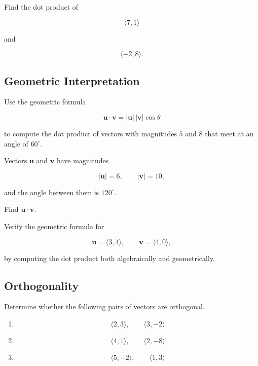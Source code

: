 \begin{exercise}
Find the dot product of

\[
\langle 7,1\rangle
\]

and

\[
\langle -2,8\rangle.
\]
\end{exercise}

\subsection*{Geometric Interpretation}

\begin{exercise}
Use the geometric formula

\[
\mathbf{u}\cdot\mathbf{v}
=
|\mathbf{u}|\,|\mathbf{v}|\cos\theta
\]

to compute the dot product of vectors with magnitudes $5$ and $8$ that
meet at an angle of $60^\circ$.
\end{exercise}

\begin{exercise}
Vectors $\mathbf{u}$ and $\mathbf{v}$ have magnitudes

\[
|\mathbf{u}|=6,
\qquad
|\mathbf{v}|=10,
\]

and the angle between them is $120^\circ$.

Find $\mathbf{u}\cdot\mathbf{v}$.
\end{exercise}

\begin{exercise}
Verify the geometric formula for

\[
\mathbf{u}
=
\langle 3,4\rangle,
\qquad
\mathbf{v}
=
\langle 4,0\rangle,
\]

by computing the dot product both algebraically and geometrically.
\end{exercise}

\subsection*{Orthogonality}

\begin{exercise}
Determine whether the following pairs of vectors are orthogonal.

\begin{enumerate}
\item[(a)]
\[
\langle 2,3\rangle,
\qquad
\langle 3,-2\rangle
\]

\item[(b)]
\[
\langle 4,1\rangle,
\qquad
\langle 2,-8\rangle
\]

\item[(c)]
\[
\langle 5,-2\rangle,
\qquad
\langle 1,3\rangle
\]
\end{enumerate}
\end{exercise}

